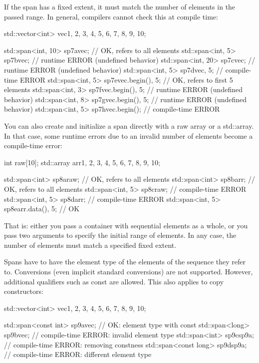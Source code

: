 If the span has a fixed extent, it must match the number of elements in the passed range. In general, compilers cannot check this at compile time:

\begin{cpp}
std::vector<int> vec{1, 2, 3, 4, 5, 6, 7, 8, 9, 10};

std::span<int, 10> sp7a{vec}; // OK, refers to all elements
std::span<int, 5> sp7b{vec}; // runtime ERROR (undefined behavior)
std::span<int, 20> sp7c{vec}; // runtime ERROR (undefined behavior)
std::span<int, 5> sp7d{vec, 5}; // compile-time ERROR
std::span<int, 5> sp7e{vec.begin(), 5}; // OK, refers to first 5 elements
std::span<int, 3> sp7f{vec.begin(), 5}; // runtime ERROR (undefined behavior)
std::span<int, 8> sp7g{vec.begin(), 5}; // runtime ERROR (undefined behavior)
std::span<int, 5> sp7h{vec.begin()}; // compile-time ERROR
\end{cpp}

You can also create and initialize a span directly with a raw array or a std::array. In that case, some runtime errors due to an invalid number of elements become a compile-time error:

\begin{cpp}
int raw[10];
std::array arr{1, 2, 3, 4, 5, 6, 7, 8, 9, 10};

std::span<int> sp8a{raw}; // OK, refers to all elements
std::span<int> sp8b{arr}; // OK, refers to all elements
std::span<int, 5> sp8c{raw}; // compile-time ERROR
std::span<int, 5> sp8d{arr}; // compile-time ERROR
std::span<int, 5> sp8e{arr.data(), 5}; // OK
\end{cpp}

That is: either you pass a container with sequential elements as a whole, or you pass two arguments to specify the initial range of elements. In any case, the number of elements must match a specified fixed extent.


Spans have to have the element type of the elements of the sequence they refer to. Conversions (even implicit standard conversions) are not supported. However, additional qualifiers such as const are allowed. This also applies to copy constructors:

\begin{cpp}
std::vector<int> vec{1, 2, 3, 4, 5, 6, 7, 8, 9, 10};

std::span<const int> sp9a{vec}; // OK: element type with const
std::span<long> sp9b{vec}; // compile-time ERROR: invalid element type
std::span<int> sp9c{sp9a}; // compile-time ERROR: removing constness
std::span<const long> sp9d{sp9a}; // compile-time ERROR: different element type
\end{cpp}

